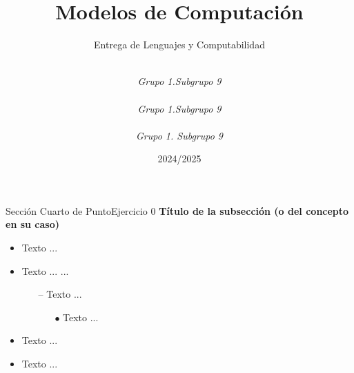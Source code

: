 \documentclass[10pt, envcountsect, presentation, aspectratio=169]{beamer}
\title[Nombre]{Modelos de Computación}
\subtitle{Entrega de Lenguajes y Computabilidad} %
\author[Carrillo G., Gallego J., Ibarrola Y.] %
{
	\sc{Ginés Carrillo Ibáñez}\\  %
	\textit{Grupo 1.Subgrupo 9}\\
	\sc{Juan Diego Gallego Nicolás}\\ %
	\textit{Grupo 1.Subgrupo 9}\\ 
	\sc{Yago Ibarrola Lapeña}\\ %
	\textit{Grupo 1. Subgrupo 9}\\ 
}
\institute[GII]%
{
	\textit{Universidad de Murcia}
}
\date{2024/2025} %
\begin{document}
	



\begin{frame}[plain]
	\titlepage
\end{frame}


\begin{frame}{Sección Cuarto de Punto}{Ejercicio 0}
\textbf{Título de la subsección (o del concepto en su caso)}
	\begin{itemize}
	\item Texto ...
	\item Texto ... \citep{Russell2020} ...
		\begin{itemize}
		\normalsize %
		\item[--] Texto ...
		
			\begin{itemize}
			\normalsize %
			\item[$\bullet$] Texto ...
			\end{itemize}	
			\end{itemize} 
	\item Texto ...		
	\item Texto ...
	\end{itemize}
\end{frame}

\end{document}
